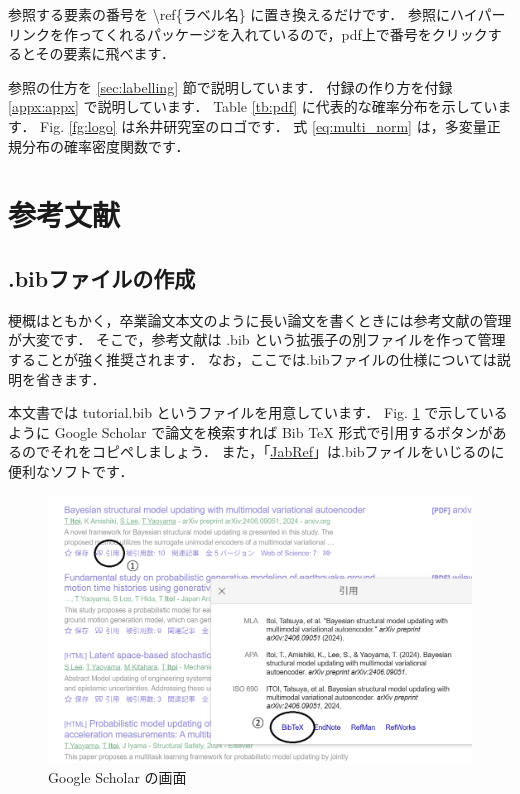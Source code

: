 \documentclass[11pt,a4j,onecolumn]{jsreport} %
\begin{document}
参照する要素の番号を \textbackslash ref\{ラベル名\} に置き換えるだけです．
参照にハイパーリンクを作ってくれるパッケージを入れているので，pdf上で番号をクリックするとその要素に飛べます．

参照の仕方を \ref{sec:labelling} 節で説明しています．
付録の作り方を付録 \ref{appx:appx} で説明しています．
Table \ref{tb:pdf} に代表的な確率分布を示しています．
Fig. \ref{fg:logo} は糸井研究室のロゴです．
式 \ref{eq:multi_norm} は，多変量正規分布の確率密度関数です．

\section{参考文献}

\subsection{.bibファイルの作成}

梗概はともかく，卒業論文本文のように長い論文を書くときには参考文献の管理が大変です．
そこで，参考文献は .bib という拡張子の別ファイルを作って管理することが強く推奨されます．
なお，ここでは.bibファイルの仕様については説明を省きます．

本文書では tutorial.bib というファイルを用意しています．
Fig. \ref{fg:scholar} で示しているように Google Scholar で論文を検索すれば Bib TeX 形式で引用するボタンがあるのでそれをコピペしましょう．
また，「\href{https://www.jabref.org/}{JabRef}」は.bibファイルをいじるのに便利なソフトです．

\begin{figure}[hbtp]
  \centering
  \includegraphics[keepaspectratio, width=100truemm]{figure/scholar.png}
  \caption{Google Scholar の画面}
  \label{fg:scholar}
\end{figure}
\end{document}
